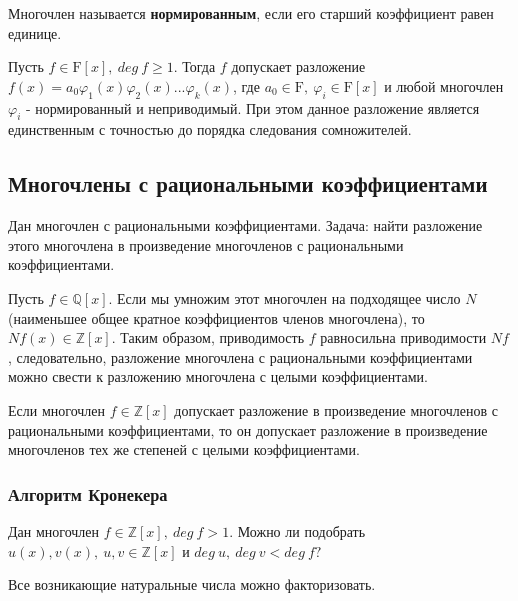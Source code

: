\documentclass[12pt]{article}
\begin{document}
\begin{defn}
Многочлен называется \textbf{нормированным}, если его старший коэффициент равен единице.
\end{defn}

\begin{thm}
Пусть $f \in \mathrm{F}[x],$\mbox{$~deg~f \geq 1$.} Тогда $f$ допускает разложение $f(x) = a_0 \varphi_1(x) \varphi_2(x) ... \varphi_k(x)$,
 где $a_0 \in \mathrm{F},~\varphi_i \in \mathrm{F}[x]$ и любой многочлен $\varphi_i$ - нормированный и неприводимый. При этом данное разложение является единственным с точностью до порядка следования сомножителей.
\end{thm}

\subsection{Многочлены с рациональными коэффициентами}
\hspace{0.6cm}Дан многочлен с рациональными коэффициентами. Задача: найти разложение этого многочлена в произведение многочленов с рациональными коэффициентами.

Пусть $f \in \mathbb{Q}[x].$ Если мы умножим этот многочлен на подходящее число $N$ (наименьшее общее кратное коэффициентов членов многочлена), то $Nf(x) \in \mathbb{Z}[x].$ Таким образом, приводимость $f$ равносильна приводимости $Nf$, следовательно, разложение многочлена с рациональными коэффициентами можно свести к разложению многочлена с целыми коэффициентами. 

\begin{thm}
Если многочлен $f \in \mathbb{Z}[x]$ допускает разложение в произведение многочленов с рациональными коэффициентами, то он допускает разложение в произведение многочленов тех же степеней с целыми коэффициентами.
\end{thm}

\subsubsection{Алгоритм Кронекера}
\hspace{0.6cm}Дан многочлен $f \in \mathbb{Z}[x],~deg~f>1.$ Можно ли подобрать $u(x), v(x), ~u, v \in \mathbb{Z}[x]$ и $deg~u,~deg~v < deg~f?$

\begin{predp}
Все возникающие натуральные числа можно факторизовать.
\end{predp}
\end{document}
